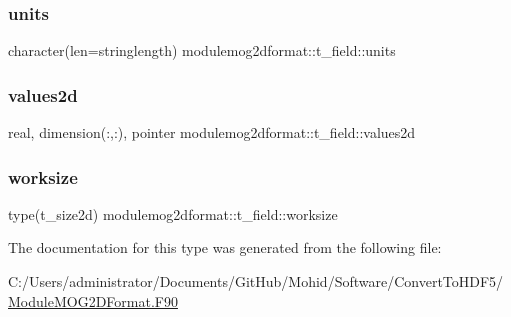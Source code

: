 \subsubsection{\texorpdfstring{units}{units}}
{\footnotesize\ttfamily character(len=stringlength) modulemog2dformat\+::t\+\_\+field\+::units\hspace{0.3cm}{\ttfamily [private]}}

\mbox{\label{structmodulemog2dformat_1_1t__field_a82c8d57747512f912294262ebcc830a2}} 
\subsubsection{\texorpdfstring{values2d}{values2d}}
{\footnotesize\ttfamily real, dimension(\+:,\+:), pointer modulemog2dformat\+::t\+\_\+field\+::values2d\hspace{0.3cm}{\ttfamily [private]}}

\mbox{\label{structmodulemog2dformat_1_1t__field_a8dbe2e88397c780bc8d895f9f3bd1f35}} 
\subsubsection{\texorpdfstring{worksize}{worksize}}
{\footnotesize\ttfamily type(t\+\_\+size2d) modulemog2dformat\+::t\+\_\+field\+::worksize\hspace{0.3cm}{\ttfamily [private]}}



The documentation for this type was generated from the following file\+:\begin{DoxyCompactItemize}
\item 
C\+:/\+Users/administrator/\+Documents/\+Git\+Hub/\+Mohid/\+Software/\+Convert\+To\+H\+D\+F5/\mbox{\hyperlink{_module_m_o_g2_d_format_8_f90}{Module\+M\+O\+G2\+D\+Format.\+F90}}\end{DoxyCompactItemize}
